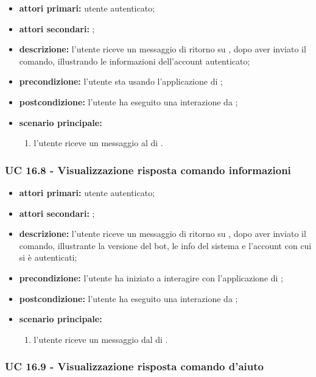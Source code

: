 	\begin{itemize}
			\item \textbf{attori primari:} utente autenticato;
			\item \textbf{attori secondari:} ;
			\item \textbf{descrizione:} l'utente riceve un messaggio di ritorno su , dopo aver inviato il comando, illustrando le informazioni dell'account autenticato;
			\item \textbf{precondizione:} l'utente sta usando l'applicazione di ;
			\item \textbf{postcondizione:} l'utente ha eseguito una interazione da ;
			\item \textbf{scenario principale:}
			\begin{enumerate}
				\item l'utente riceve un messaggio al  di .
			\end{enumerate}
		\end{itemize}

	\subsubsection{UC 16.8 - Visualizzazione risposta comando informazioni}

	\begin{itemize}
			\item \textbf{attori primari:} utente autenticato;
			\item \textbf{attori secondari:} ;
			\item \textbf{descrizione:} l'utente riceve un messaggio di ritorno su , dopo aver inviato il comando, illustrante la versione del bot, le info del sistema e l'account con cui si è autenticati;
			\item \textbf{precondizione:} l'utente ha iniziato a interagire con l'applicazione di ;
			\item \textbf{postcondizione:} l'utente ha eseguito una interazione da ;
			\item \textbf{scenario principale:}
			\begin{enumerate}
				\item l'utente riceve un messaggio dal  di .
			\end{enumerate}
		\end{itemize}

	\subsubsection{UC 16.9 - Visualizzazione risposta comando d'aiuto }

